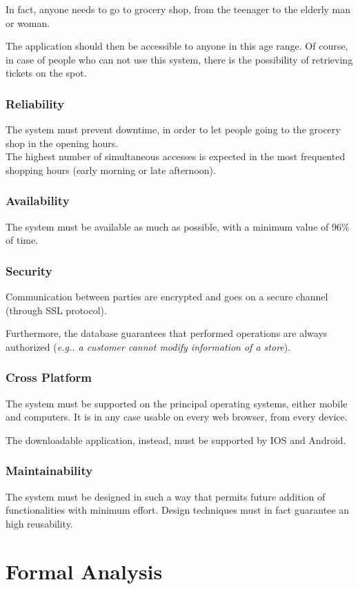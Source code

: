 \documentclass[table, 12pt]{article}
\begin{document}
\begin{flushleft}
    In fact, anyone needs to go to grocery shop, from the teenager to the elderly man or woman.

    The application should then be accessible to anyone in this age range. Of course, in case of people who can not use this system, there is the possibility of retrieving tickets on the spot.
    \subsubsection{Reliability}
    The system must prevent downtime, in order to let people going to the grocery shop in the opening hours. \\
    The highest number of simultaneous accesses is expected in the most frequented shopping hours (early morning or late afternoon).
    \subsubsection{Availability}
    The system must be available as much as possible, with a minimum value of 96\% of time.
    \subsubsection{Security}
    Communication between parties are encrypted and goes on a secure channel (through SSL protocol).

    Furthermore, the database guarantees that performed operations are always authorized (\textit{e.g.. a customer cannot modify information of a store}).
    \subsubsection{Cross Platform}
    The system must be supported on the principal operating systems, either mobile and computers. It is in any case usable on every web browser, from every device.

    The downloadable application, instead, must be supported by IOS and Android.
    \subsubsection{Maintainability}
    The system must be designed in such a way that permits future addition of functionalities with minimum effort.
    Design techniques must in fact guarantee an high reusability.
    \newpage
    \section{Formal Analysis}

\end{flushleft}
\end{document}
